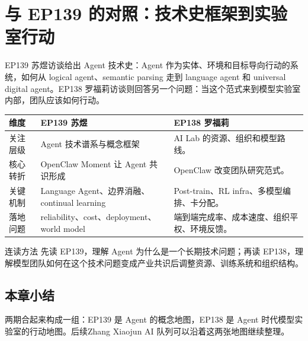 \section{与 EP139 的对照：技术史框架到实验室行动}

EP139 苏煜访谈给出 Agent 技术史：Agent 作为实体、环境和目标导向行动的系统，如何从 logical agent、semantic parsing 走到 language agent 和 universal digital agent。EP138 罗福莉访谈则回答另一个问题：当这个范式来到模型实验室内部，团队应该如何行动。

\noindent\begin{tabularx}{\textwidth}{p{}p{}X}
\toprule
维度 & EP139 苏煜 & EP138 罗福莉 \\
\midrule
关注层级 & Agent 技术谱系与概念框架 & AI Lab 的资源、组织和模型路线。 \\
核心转折 & OpenClaw Moment 让 Agent 共识形成 & OpenClaw 改变团队研究范式。 \\
关键机制 & Language Agent、边界消融、continual learning & Post-train、RL infra、多模型编排、卡分配。 \\
落地问题 & reliability、cost、deployment、world model & 端到端完成率、成本速度、组织平权、环境反馈。 \\
\bottomrule
\end{tabularx}

\begin{knowledgebox}{连读方法}
先读 EP139，理解 Agent 为什么是一个长期技术问题；再读 EP138，理解模型团队如何在这个技术问题变成产业共识后调整资源、训练系统和组织结构。
\end{knowledgebox}

\subsection{本章小结}

两期合起来构成一组：EP139 是 Agent 的概念地图，EP138 是 Agent 时代模型实验室的行动地图。后续Zhang Xiaojun AI 队列可以沿着这两张地图继续整理。


